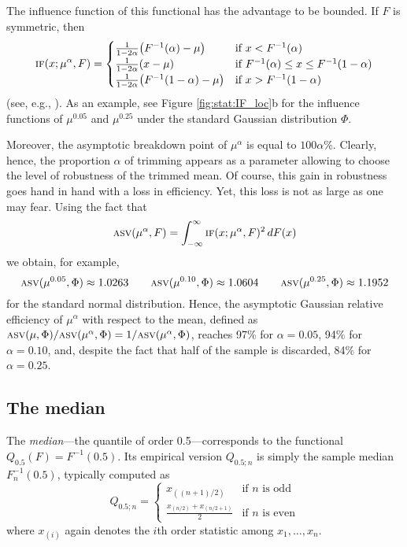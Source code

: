 The influence function of this functional has the advantage to be bounded. If
$F$ is symmetric, then
\[
    \stsc{IF}(x; \mu^\alpha, F) = 
    \begin{cases}
        \frac{1}{1-2\alpha}\left(F^{-1}(\alpha) - \mu\right)   & \text{if $x<F^{-1}(\alpha)$} \\
        \frac{1}{1-2\alpha}(x - \mu)                           & \text{if $F^{-1}(\alpha)\leq x\leq F^{-1}(1-\alpha)$} \\
        \frac{1}{1-2\alpha}\left(F^{-1}(1-\alpha) - \mu\right) & \text{if $x>F^{-1}(1-\alpha)$}
    \end{cases}
\]
(see, e.g., \citealp{staudte:sheather:1990}). As an example, see Figure
\ref{fig:stat:IF_loc}b for the influence functions of $\mu^{0.05}$ and
$\mu^{0.25}$ under the standard Gaussian distribution $\Phi$.

Moreover, the asymptotic breakdown point of $\mu^\alpha$ is equal to
$100\alpha\%$. Clearly, hence, the proportion $\alpha$ of trimming appears as a
parameter allowing to choose the level of robustness of the trimmed mean. 
Of course, this gain in robustness goes hand in hand with a loss in efficiency.
Yet, this loss is not as large as one may fear. Using the fact that
\[
    \stsc{ASV}(\mu^\alpha, F) = \int_{-\infty}^\infty \stsc{IF}(x; \mu^\alpha, F)^2 \dif F(x)
\]
we obtain, for example,                                                         
\[
    \stsc{ASV}(\mu^{0.05}, \Phi) \approx 1.0263 \qquad
    \stsc{ASV}(\mu^{0.10}, \Phi) \approx 1.0604 \qquad
    \stsc{ASV}(\mu^{0.25}, \Phi) \approx 1.1952
\]
for the standard normal distribution. Hence, the asymptotic Gaussian relative
efficiency of $\mu^\alpha$ with respect to the mean, defined as
$\stsc{ASV}(\mu, \Phi) / \stsc{ASV}(\mu^\alpha, \Phi) = 1 /
\stsc{ASV}(\mu^\alpha, \Phi)$, reaches 97\% for $\alpha = 0.05$, 94\% for
$\alpha = 0.10$, and, despite the fact that half of the sample is discarded,
84\% for $\alpha = 0.25$.

\subsection{The median}

The \emph{median}---the quantile of order 0.5---corresponds to the
functional $Q_{0.5}(F) = F^{-1}(0.5)$. Its empirical version $Q_{0.5; n}$ is
simply the sample median $F_n^{-1}(0.5)$, typically computed as
\[
    Q_{0.5;n} = 
    \begin{cases}
        x_{((n+1)/2)}                       & \text{if $n$ is odd}\\[1ex]
        \frac{x_{(n/2)} + x_{(n/2 + 1)}}{2} & \text{if $n$ is even}
    \end{cases}
\]
where $x_{(i)}$ again denotes the $i$th order statistic among $x_1, \dots,
x_n$.

